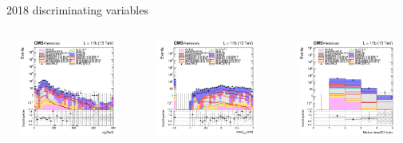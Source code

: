 \documentclass[8pt]{beamer}
\begin{document}
\begin{frame}{2018 discriminating variables}
\begin{columns}
\begin{column}{0.33\textwidth}
\begin{center}
    		\end{center}		
		\end{column}
\end{columns}
\begin{columns}
		\begin{column}{0.33\textwidth}
			\begin{center}
     			\includegraphics[width=1.0\textwidth, height=90pt]{figs/2018/log_cratio_topCR_ll_mblt.png}
    		\end{center}		
		\end{column}
		\begin{column}{0.33\textwidth}
			\begin{center}
     			\includegraphics[width=1.0\textwidth, height=90pt]{figs/2018/log_cratio_topCR_ll_costhetall.png}
    		\end{center}		
		\end{column}
		\begin{column}{0.33\textwidth}
			\begin{center}
     			\includegraphics[width=1.0\textwidth, height=90pt]{figs/2018/log_cratio_topCR_ll_nbjet.png}
    		\end{center}		
		\end{column}
\end{columns} \vfill
\end{frame}
\end{document}
